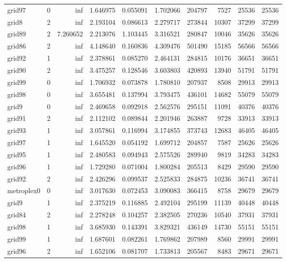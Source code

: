 \begin{longtable}{|l|r|r|r|r|r|r|r|r|r|}
grid97 & 0 & inf & 1.646975 & 0.055091 & 1.702066 & 204797 & 7527 & 25536 & 25536 \\
grid8 & 2 & inf & 2.193104 & 0.086613 & 2.279717 & 273844 & 10307 & 37299 & 37299 \\
grid89 & 2 & 7.260652 & 2.213076 & 1.103445 & 3.316521 & 280847 & 10046 & 35626 & 35626 \\
grid86 & 2 & inf & 4.148640 & 0.160836 & 4.309476 & 501490 & 15185 & 56566 & 56566 \\
grid92 & 1 & inf & 2.378861 & 0.085270 & 2.464131 & 284815 & 10176 & 36651 & 36651 \\
grid90 & 2 & inf & 3.475257 & 0.128546 & 3.603803 & 420893 & 13940 & 51791 & 51791 \\
grid99 & 0 & inf & 1.706932 & 0.073878 & 1.780810 & 207937 & 8508 & 29913 & 29913 \\
grid98 & 0 & inf & 3.655481 & 0.137994 & 3.793475 & 436101 & 14682 & 55079 & 55079 \\
grid9 & 0 & inf & 2.469658 & 0.092918 & 2.562576 & 295151 & 11091 & 40376 & 40376 \\
grid91 & 2 & inf & 2.112102 & 0.089844 & 2.201946 & 263887 & 9728 & 33913 & 33913 \\
grid93 & 1 & inf & 3.057861 & 0.116994 & 3.174855 & 373743 & 12683 & 46405 & 46405 \\
grid97 & 1 & inf & 1.645520 & 0.054192 & 1.699712 & 204857 & 7587 & 25626 & 25626 \\
grid95 & 1 & inf & 2.480583 & 0.094943 & 2.575526 & 289940 & 9819 & 34283 & 34283 \\
grid96 & 1 & inf & 1.729280 & 0.071004 & 1.800284 & 205513 & 8429 & 29590 & 29590 \\
grid92 & 2 & inf & 2.426296 & 0.099537 & 2.525833 & 284875 & 10236 & 36741 & 36741 \\
metroplex0 & 0 & inf & 3.017630 & 0.072453 & 3.090083 & 366415 & 8758 & 29679 & 29679 \\
grid9 & 1 & inf & 2.375219 & 0.116885 & 2.492104 & 295199 & 11139 & 40448 & 40448 \\
grid84 & 2 & inf & 2.278248 & 0.104257 & 2.382505 & 270236 & 10540 & 37931 & 37931 \\
grid98 & 1 & inf & 3.685930 & 0.143391 & 3.829321 & 436149 & 14730 & 55151 & 55151 \\
grid99 & 1 & inf & 1.687601 & 0.082261 & 1.769862 & 207989 & 8560 & 29991 & 29991 \\
grid96 & 2 & inf & 1.652106 & 0.081707 & 1.733813 & 205567 & 8483 & 29671 & 29671 \\

\end{longtable}
